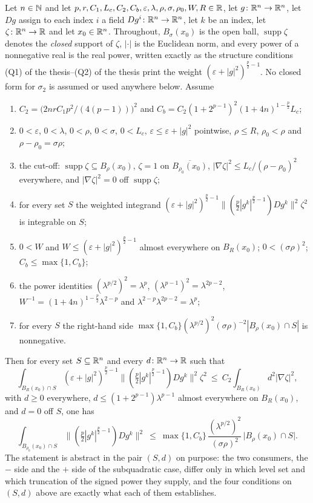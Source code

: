 \begin{helper}
Let $n\in\mathbb{N}$ and let
$p,r,C_1,L_c,C_2,C_b,\varepsilon,\lambda,\rho,\sigma,\rho_0,W,R\in\mathbb{R}$, let
$g\colon\mathbb{R}^n\to\mathbb{R}^n$, let $Dg$ assign to each index $i$ a field
$Dg^i\colon\mathbb{R}^n\to\mathbb{R}^n$, let $k$ be an index, let $\zeta\colon\mathbb{R}^n\to\mathbb{R}$ and
let $x_0\in\mathbb{R}^n$.  Throughout, $B_\sigma(x_0)$ is the open ball,
$\operatorname{supp}\zeta$ denotes the \emph{closed} support of $\zeta$,
$|\cdot|$ is the Euclidean norm, and every power of a nonnegative real is the
real power, written exactly as the structure conditions
(Q1) of the thesis--(Q2) of the thesis print the weight
$(\varepsilon+|g|^2)^{\frac p2-1}$.  No closed form for $\sigma_2$ is assumed
or used anywhere below.  Assume
\begin{enumerate}
\item[(H1)] $C_2=\bigl(2nrC_1p^2/(4(p-1))\bigr)^2$ and
  $C_b=C_2(1+2^{p-1})^2(1+4n)^{1-\frac p2}L_c$;
\item[(H2)] $0<\varepsilon$, $0<\lambda$, $0<\rho$, $0<\sigma$, $0<L_c$,
  $\varepsilon\le\varepsilon+|g|^2$ pointwise, $\rho\le R$, $\rho_0<\rho$ and
  $\rho-\rho_0=\sigma\rho$;
\item[(H3)] the cut-off: $\operatorname{supp}\zeta\subseteq B_\rho(x_0)$,
  $\zeta=1$ on $\overline{B_{\rho_0}(x_0)}$,
  $|\nabla\zeta|^2\le L_c/(\rho-\rho_0)^2$ everywhere, and $|\nabla\zeta|^2=0$
  off $\operatorname{supp}\zeta$;
\item[(H4)] for every set $S$ the weighted integrand
  $(\varepsilon+|g|^2)^{\frac p2-1}\bigl\|(\tfrac p2|g^k|^{\frac p2-1})Dg^k\bigr\|^2\zeta^2$
  is integrable on $S$;
\item[(H5)] $0<W$ and $W\le(\varepsilon+|g|^2)^{\frac p2-1}$ almost everywhere
  on $B_R(x_0)$; $0<(\sigma\rho)^2$; $C_b\le\max\{1,C_b\}$;
\item[(H6)] the power identities $(\lambda^{p/2})^2=\lambda^{p}$,
  $(\lambda^{p-1})^2=\lambda^{2p-2}$,
  $W^{-1}=(1+4n)^{1-\frac p2}\lambda^{2-p}$ and
  $\lambda^{2-p}\lambda^{2p-2}=\lambda^{p}$;
\item[(H7)] for every $S$ the right-hand side
  $\max\{1,C_b\}(\lambda^{p/2})^2(\sigma\rho)^{-2}|B_\rho(x_0)\cap S|$ is
  nonnegative.
\end{enumerate}
Then for every set $S\subseteq\mathbb{R}^n$ and every $d\colon\mathbb{R}^n\to\mathbb{R}$ such that
\[
\int_{B_R(x_0)\cap S}(\varepsilon+|g|^2)^{\frac p2-1}
  \bigl\|(\tfrac p2|g^k|^{\frac p2-1})Dg^k\bigr\|^2\zeta^2
\ \le\ C_2\int_{B_R(x_0)}d^2|\nabla\zeta|^2 ,
\]
with $d\ge0$ everywhere, $d\le(1+2^{p-1})\lambda^{p-1}$ almost everywhere on
$B_R(x_0)$, and $d=0$ off $S$, one has
\[
\int_{B_{\rho_0}(x_0)\cap S}
  \bigl\|(\tfrac p2|g^k|^{\frac p2-1})Dg^k\bigr\|^2
\ \le\ \max\{1,C_b\}\,\frac{(\lambda^{p/2})^2}{(\sigma\rho)^2}\,
  \bigl|B_\rho(x_0)\cap S\bigr| .
\]
The statement is abstract in the pair $(S,d)$ on purpose: the two consumers,
the $-$ side and the $+$ side of the subquadratic case, differ only in which
level set and which truncation of the signed power they supply, and the four
conditions on $(S,d)$ above are exactly what each of them establishes.
\end{helper}
